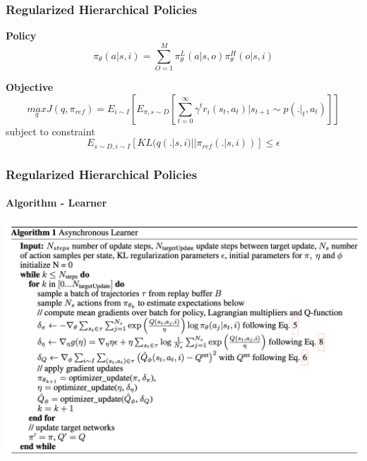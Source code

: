 \documentclass{beamer}
\begin{document}
\begin{frame}
\frametitle{Regularized Hierarchical Policies}
	\textbf{Policy}
	\begin{equation}
	\pi_{\theta} (a | s, i) = \sum_{O=1}^{M} \pi_{\theta}^L(a | s, o) \pi_{\theta}^H(o | s, i)
	\end{equation}
	
	\textbf{Objective}
	\begin{equation}
	\underset{q}{max} J(q, \pi_{ref}) = E_{i \sim I} \left[ E_{\pi, s \sim D} \left[ \sum_{t=0}^{\infty} \gamma^t r_i(s_t, a_t) | s_{t+1} \sim p(.|_t, a_t) \right] \right]
	\end{equation}
	subject to constraint
	\begin{equation}
		E_{s \sim D, i \sim I} \left[ KL(q(. | s, i) || \pi_{ref}(. | s, i)) \right] \leq \epsilon
	\end{equation}
\end{frame}

\begin{frame}
	\frametitle{Regularized Hierarchical Policies}
	\framesubtitle{Algorithm - Learner}
	
	\begin{center}
		\includegraphics[scale=0.25]{algorithm-learner}
	\end{center}
	
\end{frame}
\end{document}
